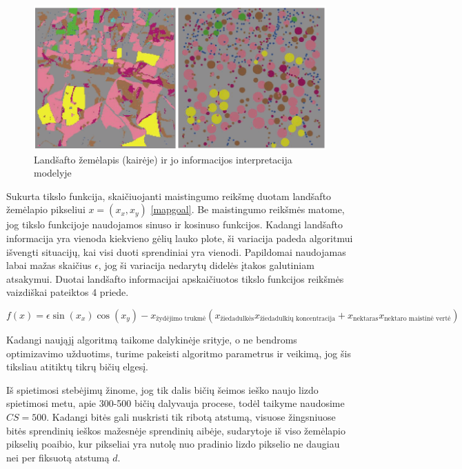 \documentclass{VUMIFPSmagistrinis}
\begin{document}
\begin{figure}[H]
    \centering
    \includegraphics[scale=0.45]{img/new/maps.png}
    \caption{Landšafto žemėlapis (kairėje) ir jo informacijos interpretacija modelyje}
    \label{img:new1}
\end{figure}

Sukurta tikslo funkcija, skaičiuojanti maistingumo reikšmę duotam landšafto žemėlapio pikseliui $x=(x_{x},x_{y})$ \eqref{mapgoal}. Be maistingumo reikšmės matome, jog tikslo funkcijoje naudojamos sinuso ir kosinuso funkcijos. Kadangi landšafto informacija yra vienoda kiekvieno gėlių lauko plote, ši variacija padeda algoritmui išvengti situacijų, kai visi duoti sprendiniai yra vienodi. Papildomai naudojamas labai mažas skaičius $\epsilon$, jog ši variacija nedarytų didelės įtakos galutiniam atsakymui. Duotai landšafto informacijai apskaičiuotos tikslo funkcijos reikšmės vaizdiškai pateiktos 4 priede. 

\begin{equation}\label{mapgoal}
f(x) = \epsilon\sin{(x_{x})}\cos{(x_{y})} - x_{\text{žydėjimo trukmė}}  (x_{\text{žiedadulkės}}x_{\text{žiedadulkių koncentracija}} + x_{\text{nektaras}}x_{\text{nektaro maistinė vertė}}) 
\end{equation}

Kadangi naująjį algoritmą taikome dalykinėje srityje, o ne bendroms optimizavimo užduotims, turime pakeisti algoritmo parametrus ir veikimą, jog šis tiksliau atitiktų tikrų bičių elgesį. 

Iš spietimosi stebėjimų \cite{See10} žinome, jog tik dalis bičių šeimos ieško naujo lizdo spietimosi metu, apie 300-500 bičių dalyvauja procese, todėl taikyme naudosime $CS=500$. Kadangi bitės gali nuskristi tik ribotą atstumą, visuose žingsniuose bitės sprendinių ieškos mažesnėje sprendinių aibėje, sudarytoje iš viso žemėlapio pikselių poaibio, kur pikseliai yra nutolę nuo pradinio lizdo pikselio ne daugiau nei per fiksuotą atstumą $d$.
\end{document}
